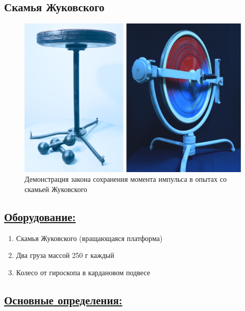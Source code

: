 \documentclass[14pt,a4paper,oneside]{extarticle}	%
\begin{document}
	
	\newpage
	\begin{center}
		\subsection*{Скамья Жуковского}
	\end{center}
		
\begin{figure}[H] 	
	\centering 	
	\includegraphics[width=0.9\linewidth]{chair-1.png}
	\caption{Демонстрация закона сохранения момента импульса в опытах со скамьей Жуковского}
	\label{chair-1}
\end{figure}
	
	\subsection*{\underline{Оборудование:}}

			\begin{enumerate} 
			\item Скамья Жуковского (вращающаяся платформа)
			\item Два груза массой 250 г каждый
			\item Колесо от гироскопа в кардановом подвесе
		\end{enumerate}

\newpage
		\subsection*{\underline{Основные определения:}}
	
\end{document}
